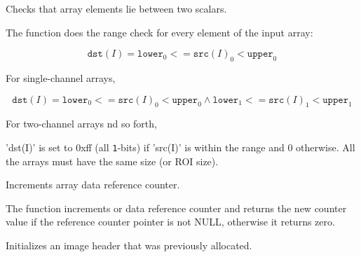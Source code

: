 Checks that array elements lie between two scalars.


\begin{description}
\end{description}


The function does the range check for every element of the input array:

\[
\texttt{dst}(I)=\texttt{lower}_0 <= \texttt{src}(I)_0 < \texttt{upper}_0
\]

For single-channel arrays,

\[
\texttt{dst}(I)=
\texttt{lower}_0 <= \texttt{src}(I)_0 < \texttt{upper}_0 \land
\texttt{lower}_1 <= \texttt{src}(I)_1 < \texttt{upper}_1
\]

For two-channel arrays nd so forth,

'dst(I)' is set to 0xff (all \texttt{1}-bits) if 'src(I)' is within the range and 0 otherwise. All the arrays must have the same size (or ROI size).

\ifC
{}
Increments array data reference counter.


\begin{description}
\end{description}

The function increments  or
 data reference counter and returns the new counter value
if the reference counter pointer is not NULL, otherwise it returns zero.

Initializes an image header that was previously allocated.


\begin{description}
\end{description}

